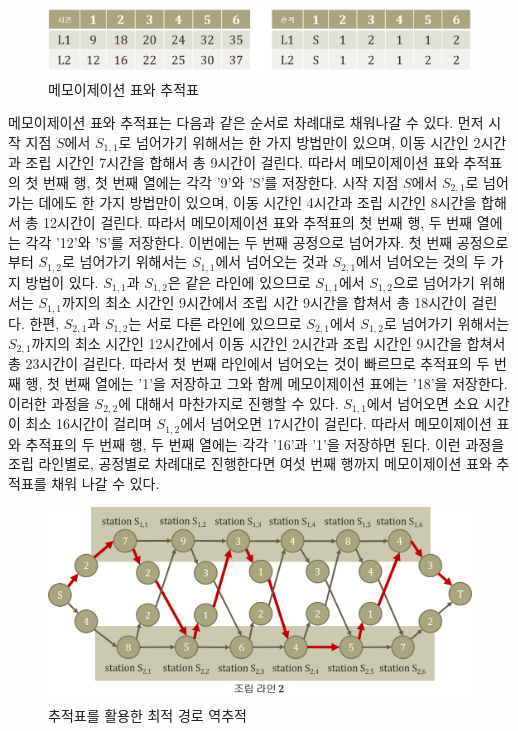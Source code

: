 \documentclass[a4paper]{oblivoir}
\begin{document}
\begin{figure}[ht] \centering 
\includegraphics[scale=0.45]{fig9_14.png} 
\caption{메모이제이션 표와 추적표}
\label{fig:9-15}
\end{figure}

메모이제이션 표와 추적표는 다음과 같은 순서로 차례대로 채워나갈 수 있다. 먼저 시작 지점 $S$에서 $S_{1,1}$로 넘어가기 위해서는 한 가지 방법만이 있으며, 이동 시간인 2시간과 조립 시간인 7시간을 합해서 총 9시간이 걸린다. 따라서 메모이제이션 표와 추적표의 첫 번째 행, 첫 번째 열에는 각각 '9'와 'S'를 저장한다. 시작 지점 $S$에서 $S_{2,1}$로 넘어가는 데에도 한 가지 방법만이 있으며, 이동 시간인 4시간과 조립 시간인 8시간을 합해서 총 12시간이 걸린다. 따라서 메모이제이션 표와 추적표의 첫 번째 행, 두 번째 열에는 각각 '12'와 'S'를 저장한다. 이번에는 두 번째 공정으로 넘어가자. 첫 번째 공정으로부터 $S_{1,2}$로 넘어가기 위해서는 $S_{1,1}$에서 넘어오는 것과 $S_{2,1}$에서 넘어오는 것의 두 가지 방법이 있다. $S_{1,1}$과 $S_{1,2}$은 같은 라인에 있으므로 $S_{1,1}$에서 $S_{1,2}$으로 넘어가기 위해서는 $S_{1,1}$까지의 최소 시간인 9시간에서 조립 시간 9시간을 합쳐서 총 18시간이 걸린다. 한편, $S_{2,1}$과 $S_{1,2}$는 서로 다른 라인에 있으므로 $S_{2,1}$에서 $S_{1,2}$로 넘어가기 위해서는 $S_{2,1}$까지의 최소 시간인 12시간에서 이동 시간인 2시간과 조립 시간인 9시간을 합쳐서 총 23시간이 걸린다. 따라서 첫 번째 라인에서 넘어오는 것이 빠르므로 추적표의 두 번째 행, 첫 번째 열에는 '1'을 저장하고 그와 함께 메모이제이션 표에는 '18'을 저장한다. 이러한 과정을 $S_{2,2}$에 대해서 마찬가지로 진행할 수 있다. $S_{1,1}$에서 넘어오면 소요 시간이 최소 16시간이 걸리며 $S_{1,2}$에서 넘어오면 17시간이 걸린다. 따라서 메모이제이션 표와 추적표의 두 번째 행, 두 번째 열에는 각각 '16'과 '1'을 저장하면 된다. 이런 과정을 조립 라인별로, 공정별로 차례대로 진행한다면 여섯 번째 행까지 메모이제이션 표와 추적표를 채워 나갈 수 있다. \\ 

\begin{figure}[ht] \centering 
\includegraphics[scale=0.45]{fig9_15.png} 
\caption{추적표를 활용한 최적 경로 역추적}
\label{fig:9-16}
\end{figure}
\end{document}
